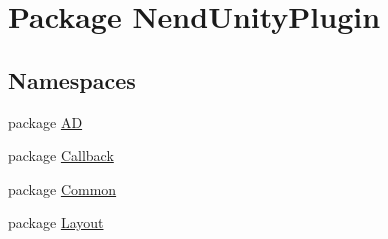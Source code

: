 \hypertarget{namespace_nend_unity_plugin}{}\section{Package Nend\+Unity\+Plugin}
\label{namespace_nend_unity_plugin}
\subsection*{Namespaces}
\begin{DoxyCompactItemize}
\item 
package \hyperlink{namespace_nend_unity_plugin_1_1_a_d}{A\+D}
\item 
package \hyperlink{namespace_nend_unity_plugin_1_1_callback}{Callback}
\item 
package \hyperlink{namespace_nend_unity_plugin_1_1_common}{Common}
\item 
package \hyperlink{namespace_nend_unity_plugin_1_1_layout}{Layout}
\end{DoxyCompactItemize}
